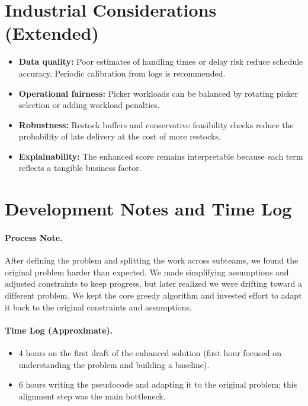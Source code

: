 \documentclass[11pt]{article}
\begin{document}
\section{Industrial Considerations (Extended)}
\begin{itemize}[leftmargin=1.25em]
    \item \textbf{Data quality:} Poor estimates of handling times or delay risk reduce schedule accuracy. Periodic calibration from logs is recommended.
    \item \textbf{Operational fairness:} Picker workloads can be balanced by rotating picker selection or adding workload penalties.
    \item \textbf{Robustness:} Restock buffers and conservative feasibility checks reduce the probability of late delivery at the cost of more restocks.
    \item \textbf{Explainability:} The enhanced score remains interpretable because each term reflects a tangible business factor.
\end{itemize}

\section{Development Notes and Time Log}
\paragraph{Process Note.}
After defining the problem and splitting the work across subteams, we found the original problem harder than expected. We made simplifying assumptions and adjusted constraints to keep progress, but later realized we were drifting toward a different problem. We kept the core greedy algorithm and invested effort to adapt it back to the original constraints and assumptions.

\paragraph{Time Log (Approximate).}
\begin{itemize}[leftmargin=1.25em]
    \item 4 hours on the first draft of the enhanced solution (first hour focused on understanding the problem and building a baseline).
    \item 6 hours writing the pseudocode and adapting it to the original problem; this alignment step was the main bottleneck.
\end{itemize}
\end{document}
